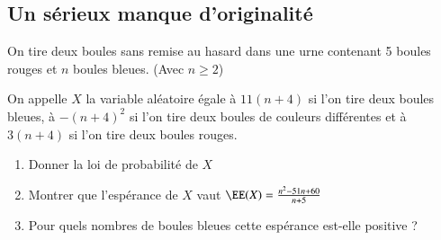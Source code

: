 \documentclass[oneside,12pt]{article}          %
\begin{document}
\subsection{Un sérieux manque d'originalité}
On tire deux boules sans remise au hasard dans une urne contenant 5 boules rouges et $n$ boules bleues. (Avec $n\geq2$)

On appelle $X$ la variable aléatoire égale à $11(n+4)$ si l'on tire deux boules bleues, à $-(n+4)^2$ si l'on tire deux boules de couleurs différentes et à $3(n+4)$ si l'on tire deux boules rouges.
\begin{enumerate}
    \item Donner la loi de probabilité de $X$
    \item Montrer que l'espérance de $X$ vaut $\EE(X) = \frac{n^2-51n+60}{n+5}$
    \item Pour quels nombres de boules bleues cette espérance est-elle positive ?
\end{enumerate}
\end{document}
